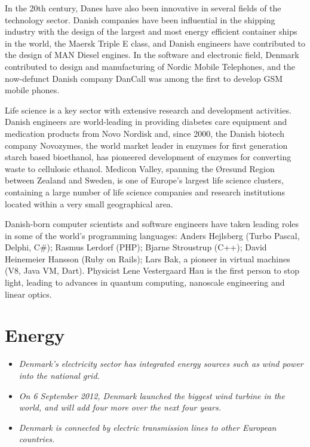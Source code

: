 In the 20th century, Danes have also been innovative in several fields
of the technology sector. Danish companies have been influential in the
shipping industry with the design of the largest and most energy
efficient container ships in the world, the Maersk Triple E class, and
Danish engineers have contributed to the design of MAN Diesel engines.
In the software and electronic field, Denmark contributed to design and
manufacturing of Nordic Mobile Telephones, and the now-defunct Danish
company DanCall was among the first to develop GSM mobile phones.

Life science is a key sector with extensive research and development
activities. Danish engineers are world-leading in providing diabetes
care equipment and medication products from Novo Nordisk and, since
2000, the Danish biotech company Novozymes, the world market leader in
enzymes for first generation starch based bioethanol, has pioneered
development of enzymes for converting waste to cellulosic ethanol.
Medicon Valley, spanning the Øresund Region between Zealand and Sweden,
is one of Europe's largest life science clusters, containing a large
number of life science companies and research institutions located
within a very small geographical area.

Danish-born computer scientists and software engineers have taken
leading roles in some of the world's programming languages: Anders
Hejlsberg (Turbo Pascal, Delphi, C\#); Rasmus Lerdorf (PHP); Bjarne
Stroustrup (C++); David Heinemeier Hansson (Ruby on Rails); Lars Bak, a
pioneer in virtual machines (V8, Java VM, Dart). Physicist Lene
Vestergaard Hau is the first person to stop light, leading to advances
in quantum computing, nanoscale engineering and linear optics.

\section{Energy}\label{energy}

\begin{itemize}
\item
  \emph{Denmark's electricity sector has integrated energy sources such
  as wind power into the national grid.}
\item
  \emph{On 6 September 2012, Denmark launched the biggest wind turbine
  in the world, and will add four more over the next four years.}
\item
  \emph{Denmark is connected by electric transmission lines to other
  European countries.}
\end{itemize}

